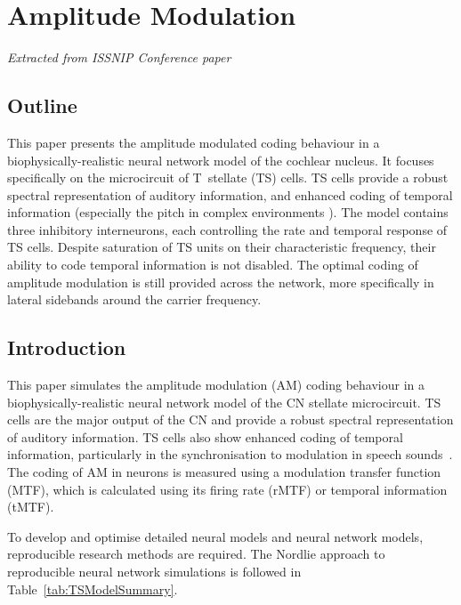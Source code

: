 
\section{Amplitude Modulation}

\textit{Extracted from ISSNIP Conference paper}

\subsection*{Outline}
  This paper presents the amplitude modulated coding behaviour
  in a biophysically-realistic neural network model of the cochlear
  nucleus. It focuses specifically on the microcircuit of
  T~stellate (TS) cells.  TS cells provide a robust spectral
  representation of auditory information, and enhanced coding of
  temporal information (especially the pitch in complex
  environments \cite{KeilsonRichardsEtAl:1997}).  The model
  contains three inhibitory interneurons, each controlling the rate
  and temporal response of TS cells.  Despite saturation of TS
  units on their characteristic frequency, their ability to code
  temporal information is not disabled.  The optimal coding of
  amplitude modulation is still provided across the network, more
  specifically in lateral sidebands around the carrier frequency.



\subsection{Introduction}
%

This paper simulates the amplitude modulation (AM) coding behaviour
in a biophysically-realistic neural network model of the CN
stellate microcircuit. TS cells are the major output of the CN and
provide a robust spectral representation of auditory information.
TS cells also show enhanced coding of temporal information,
particularly in the synchronisation to modulation in speech
sounds~\cite{BlackburnSachs:1990,KeilsonRichardsEtAl:1997}.  The
coding of AM in neurons is measured using a modulation transfer
function (MTF), which is calculated using its firing rate (rMTF) or
temporal information (tMTF).

To develop and optimise detailed neural models and neural network
models, reproducible research methods are required. The Nordlie
approach to reproducible neural network simulations
\cite{NordlieGewaltigEtAl:2009} is followed in
Table~\ref{tab:TSModelSummary}. 


